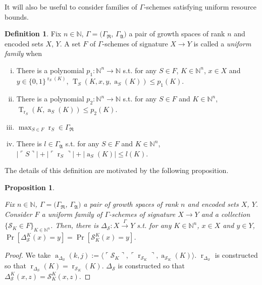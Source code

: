 \documentclass{article}
\numberwithin{equation}{section}
\theoremstyle{definition}
\newtheorem{definition}{Definition}[section]
\theoremstyle{plain}
\newtheorem{proposition}{Proposition}[section]
\newcommand{\WordsLen}[1]{{\{ 0, 1 \}^{#1}}}
\DeclareMathOperator{\T}{T}
\DeclareMathOperator{\R}{r}
\DeclareMathOperator{\A}{a}
\newcommand{\Nats}{\mathbb{N}}
\newcommand{\Abs}[1]{\lvert #1 \rvert}
\newcommand{\Chev}[1]{\langle #1 \rangle}
\newcommand{\Quote}[1]{\ulcorner #1 \urcorner}
\newcommand{\GrowR}{\Gamma_{\mathfrak{R}}}
\newcommand{\GrowA}{\Gamma_{\mathfrak{A}}}
\begin{document}
It will also be useful to consider families of $\Gamma$-schemes satisfying uniform resource bounds.

\begin{definition}

Fix $n \in \Nats$, $\Gamma=(\GrowR$, $\GrowA)$ a pair of growth spaces of rank $n$ and encoded sets $X$, $Y$. A set $F$ of $\Gamma$-schemes of signature $X \rightarrow Y$ is called a \emph{uniform family} when

\begin{enumerate}[(i)]

\item There is a polynomial $p_1: \Nats^n \rightarrow \Nats$ s.t. for any $S \in F$, $K \in \Nats^n$, $x \in X$ and $y \in \WordsLen{\R_S(K)}$, $\T_S(K,x,y,\A_S(K)) \leq p_1(K)$.

\item There is a polynomial $p_2: \Nats^n \rightarrow \Nats$ s.t. for any $S \in F$ and $K \in \Nats^n$, $\T_{\R_S}(K,\A_S(K)) \leq p_2(K)$.

\item $\max_{S \in F} \R_S \in \GrowR$

\item There is $l \in \GrowA$ s.t. for any $S \in F$ and $K \in \Nats^n$, ${\Abs{\Quote{S}} + \Abs{\Quote{\R_S}} + \Abs{\A_S(K)} \leq l(K)}$.

\end{enumerate}

\end{definition}

The details of this definition are motivated by the following proposition.

\begin{proposition}
\label{prp:fam_diag}

Fix $n \in \Nats$, $\Gamma=(\GrowR$, $\GrowA)$ a pair of growth spaces of rank $n$ and encoded sets $X$, $Y$. Consider $F$ a uniform family of $\Gamma$-schemes of signature $X \rightarrow Y$ and a collection $\{\mathcal{S}_K \in F\}_{K \in \Nats^n}$. Then, there is $\Delta_\mathcal{S}: X \xrightarrow{
\Gamma} Y$ s.t. for any $K \in \Nats^n$, $x \in X$ and $y \in Y$, $\Pr[\Delta_\mathcal{S}^K(x)=y] = \Pr[\mathcal{S}_K^K(x)=y]$.

\end{proposition}

\begin{proof}

We take $\A_{\Delta_{\mathcal{S}}}(k,j):=\Chev{\Quote{\mathcal{S}_K},\Quote{\R_{\mathcal{S}_K}},\A_{\mathcal{S}_K}(K)}$. $\R_{\Delta_{\mathcal{S}}}$ is constructed so that $\R_{\Delta_{\mathcal{S}}}(K)=\R_{\mathcal{S}_K}(K)$. $\Delta_{\mathcal{S}}$ is constructed so that $\Delta_{\mathcal{S}}^K(x,z)=\mathcal{S}_K^K(x,z)$.

\end{proof}
\end{document}
